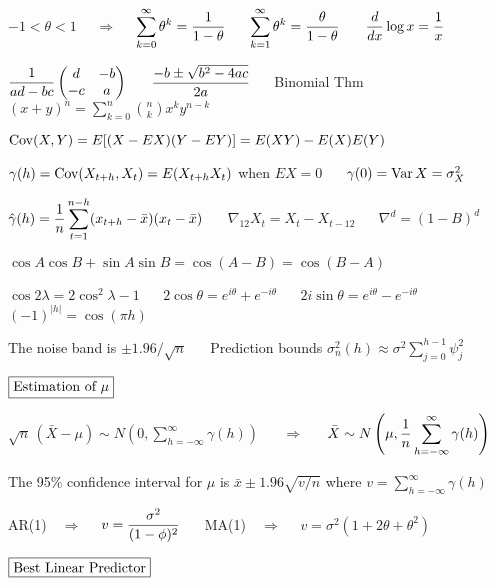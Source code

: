 \documentclass[12pt]{article}
\begin{document}
$-1<\theta<1$
$\quad\Rightarrow\quad$
$\displaystyle
\sum_{k=0}^\infty\theta^k={1\over1-\theta}$
$\quad$
$\displaystyle
\sum_{k=1}^\infty\theta^k={\theta\over1-\theta}$
$\quad$
$\displaystyle {d\over dx}\log x={1\over x}$

$\displaystyle
{1\over ad-bc}\begin{pmatrix}
d & -b\\
-c & a
\end{pmatrix}
$
$\quad$
$\displaystyle
{-b\pm\sqrt{b^2-4ac}\over2a}$
$\quad$
Binomial Thm
$\displaystyle
(x+y)^n=\sum_{k=0}^n{n\choose k}x^ky^{n-k}$

${\rm Cov}(X,Y)=E[(X-EX)(Y-EY)]=E(XY)-E(X)E(Y)$

$\gamma(h)={\rm Cov}(X_{t+h},X_t)=E(X_{t+h}X_t)$ when $EX=0$
$\quad$
$\gamma(0)=\mathop{\rm Var}X=\sigma_X^2$

$\displaystyle
\hat\gamma(h)={1\over n}\sum_{t=1}^{n-h}(x_{t+h}-\bar x)(x_t-\bar x)$
$\quad$
$\nabla_{12}X_t=X_t-X_{t-12}$
$\quad$
$\nabla^d=(1-B)^d$

$\cos A\cos B+\sin A\sin B=\cos(A-B)=\cos(B-A)$

$\cos2\lambda=2\cos^2\lambda-1$
$\quad$
$2\cos\theta=e^{i\theta}+e^{-i\theta}$
$\quad$
$2i\sin\theta=e^{i\theta}-e^{-i\theta}$
$\quad$
$(-1)^{|h|}=\cos(\pi h)$

The noise band is $\pm1.96/\sqrt{n}$
$\quad$
Prediction bounds
$\displaystyle\sigma_n^2(h)\approx\sigma^2\sum_{j=0}^{h-1}\psi_j^2$





$\boxed{\hbox{Estimation of $\mu$}}$

$\displaystyle
\sqrt{n}\,(\bar X-\mu)\sim N\left(0,\sum_{h=-\infty}^\infty\gamma(h)\right)$
$\quad$
$\Rightarrow$
$\quad$
$\displaystyle
\bar X\sim N\left(\mu,{1\over n}\sum_{h=-\infty}^\infty\gamma(h)\right)$

The 95\% confidence interval for $\mu$ is $\bar x\pm1.96\sqrt{v/n}$
where $\displaystyle v=\sum_{h=-\infty}^\infty\gamma(h)$

AR(1)$\quad\Rightarrow\quad$
$\displaystyle
v={\sigma^2\over(1-\phi)^2}$
$\quad$
MA(1)$\quad\Rightarrow\quad$
$\displaystyle
v=\sigma^2(1+2\theta+\theta^2)$



$\boxed{\hbox{Best Linear Predictor}}$
\end{document}
